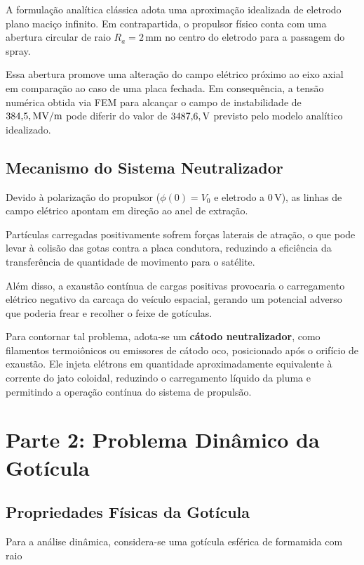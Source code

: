 \documentclass[12pt,a4paper]{article}
\begin{document}
A formulação analítica clássica adota uma aproximação idealizada de eletrodo
plano maciço infinito. Em contrapartida, o propulsor físico conta com uma abertura
circular de raio $R_a=2\,\text{mm}$ no centro do eletrodo para a passagem do spray.

Essa abertura promove uma alteração do campo elétrico próximo ao eixo axial em
comparação ao caso de uma placa fechada. Em consequência, a tensão numérica
obtida via FEM para alcançar o campo de instabilidade de
$384{,}5\\,\text{MV/m}$ pode diferir do valor de $3487{,}6\\,\text{V}$ previsto
pelo modelo analítico idealizado.

\subsection{Mecanismo do Sistema Neutralizador}

Devido à polarização do propulsor
($\phi(0)=V_0$ e eletrodo a $0\,\text{V}$), as linhas de campo elétrico apontam
em direção ao anel de extração.

Partículas carregadas positivamente sofrem forças laterais de atração, o que
pode levar à colisão das gotas contra a placa condutora, reduzindo a eficiência
da transferência de quantidade de movimento para o satélite.

Além disso, a exaustão contínua de cargas positivas provocaria o carregamento
elétrico negativo da carcaça do veículo espacial, gerando um potencial adverso
que poderia frear e recolher o feixe de gotículas.

Para contornar tal problema, adota-se um \textbf{cátodo neutralizador}, como
filamentos termoiônicos ou emissores de cátodo oco, posicionado após o orifício
de exaustão. Ele injeta elétrons em quantidade aproximadamente equivalente à
corrente do jato coloidal, reduzindo o carregamento líquido da pluma e permitindo
a operação contínua do sistema de propulsão.

\section{Parte 2: Problema Dinâmico da Gotícula}

\subsection{Propriedades Físicas da Gotícula}

Para a análise dinâmica, considera-se uma gotícula esférica de formamida com
raio
\end{document}
